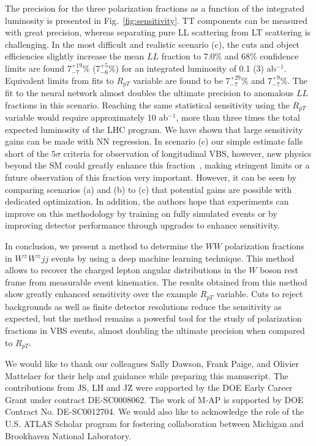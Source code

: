 \documentclass[aps,prl,twocolumn,showpacs,superscriptaddress,groupeaddress,floatfix]{revtex4}
\def\ssWW{\ensuremath{ W^{\pm}W^{\pm}jj }\xspace}
\begin{document}
The precision for the three polarization fractions as a function of the integrated luminosity is presented in Fig.~\ref{fig:sensitivity}. 
 TT components can be measured with great precision, whereas separating pure LL scattering from LT scattering is challenging.
In the most difficult and realistic scenario (c), the cuts and object efficiencies slightly increase the mean $LL$ fraction to 7.0\% and 68\% confidence limits are found 7$^{+19}_{-7}$\% (7$^{+5}_{-6}\%$) for an integrated luminosity of 0.1 (3) ab$^{-1}$.  Equivalent limits from fits to $R_{pT}$ variable are found to be 7$^{+29}_{-7}\%$ and 7$^{+9}_{-7}\%$. The fit to the neural network almost doubles the ultimate precision to anomalous $LL$ fractions in this scenario. Reaching the same statistical sensitivity using the $R_{pT}$ variable would require approximately 10 ab$^{-1}$, more than three times the total expected luminosity of the LHC program. We have shown that large sensitivity gains can be made with NN regression. In scenario (c) our simple estimate falls short of the $5\sigma$ criteria for observation of longitudinal VBS, however, new physics beyond the SM could greatly enhance this fraction~\cite{VLVLBSM}, making stringent limits or a future observation of this fraction very important. However, it can be seen by comparing scenarios (a) and (b) to (c) that potential gains are possible with dedicated optimization. In addition, the authors hope that experiments can improve on this methodology by training on fully simulated events or by improving detector performance through upgrades to enhance sensitivity. 

In conclusion, we present a method to determine the $WW$ polarization fractions in
\ssWW events by using a deep machine learning technique.  This method
allows to recover the charged lepton angular distributions in the $W$
boson rest frame from measurable event kinematics.  The
results obtained from this method show greatly enhanced sensitivity over
the example $R_{pT}$ variable.  Cuts to reject
backgrounds as well as finite detector resolutions reduce the sensitivity as
expected, but the method remains a powerful tool for the study of
polarization fractions in VBS events, almost doubling the ultimate precision when compared to $R_{pT}$.

We would like to thank our colleagues Sally Dawson, Frank Paige, and Olivier Mattelaer for their help and guidance while preparing this manuscript.
The contributions from JS, LH and JZ were supported by the DOE Early Career Grant under contract DE-SC0008062. The work of M-AP is supported by DOE Contract No. DE-SC0012704. We would also like to acknowledge the role of the U.S. ATLAS Scholar program for fostering collaboration between Michigan and Brookhaven National Laboratory.
\end{document}
